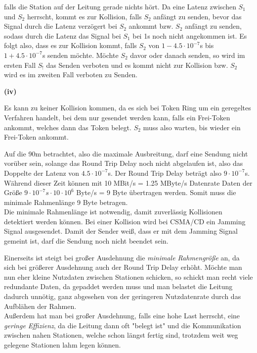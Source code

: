 \documentclass{../exercisesheet}
\begin{document}
\begin{exercise}{6}
\begin{subexercise}
\begin{adjustwidth}{2em}{0em}
	falls die Station auf der Leitung gerade nichts hört. Da eine Latenz zwischen $S_1$ und $S_2$ herrscht, kommt es zur Kollision, falls $S_2$ anfängt zu senden, bevor
	das Signal durch die Latenz verzögert bei $S_2$ ankommt bzw. $S_2$ anfängt zu senden, sodass durch die Latenz das Signal bei $S_1$ bei 1s noch nicht angekommen ist.
	Es folgt also, dass es zur Kollision kommt, falls $S_2$ von $1-4.5\cdot 10^{-7}$s bis $1+4.5\cdot 10^{-7}$s senden möchte. Möchte $S_2$ davor oder danach senden, so
	wird im ersten Fall $S_!$ das Senden verboten und es kommt nicht zur Kollision bzw. $S_2$ wird es im zweiten Fall verboten zu Senden.\\
\end{adjustwidth}
\textbf{(iv)}
\begin{adjustwidth}{2em}{0em}\vspace{-\baselineskip}
	Es kann zu keiner Kollision kommen, da es sich bei Token Ring um ein geregeltes Verfahren handelt, bei dem nur gesendet werden kann, falls ein Frei-Token ankommt, 
	welches dann das Token belegt. $S_2$ muss also warten, bis wieder ein Frei-Token ankommt.
\end{adjustwidth}
\end{subexercise}
\begin{subexercise}
	Auf die 90m betrachtet, also die maximale Ausbreitung, darf eine Sendung nicht vorüber sein, solange das Round Trip Delay noch nicht abgelaufen ist, also das Doppelte
	der Latenz von $4.5\cdot 10^{-7}$s. Der Round Trip Delay beträgt also $9\cdot 10^{-7}$s. Während dieser Zeit können mit 10 MBit/s = 1.25 MByte/s Datenrate Daten der
	Größe $9\cdot 10^{-7}s \cdot 10 \cdot 10^6$ Byte/s = 9 Byte übertragen werden. Somit muss die minimale Rahmenlänge 9 Byte betragen.\\
	Die minimale Rahmenlänge ist notwendig, damit zuverlässig Kollisionen detektiert werden können. Bei einer Kollision wird bei CSMA/CD ein Jamming Signal ausgesendet. Damit
	der Sender weiß, dass er mit dem Jamming Signal gemeint ist, darf die Sendung noch nicht beendet sein.
\end{subexercise}
\begin{subexercise}
	Einerseits ist steigt bei großer Ausdehnung die \textit{minimale Rahmengröße} an, da sich bei größerer Ausdehnung auch der Round Trip Delay erhöht. Möchte man nun
	eher kleine Nutzdaten zwischen Stationen schicken, so schickt man recht viele redundante Daten, da gepaddet werden muss und man belastet die Leitung dadurch unnötig, ganz
	abgesehen von der geringeren Nutzdatenrate durch das Aufblähen der Rahmen.\\
	Außerdem hat man bei großer Ausdehnung, falls eine hohe Last herrscht, eine \textit{geringe Effizienz}, da die Leitung dann oft "belegt ist" und die Kommunikation zwischen
	nahen Stationen, welche schon längst fertig sind, trotzdem weit weg gelegene Stationen lahm legen können.
	
\end{subexercise}
\end{exercise}
\end{document}
